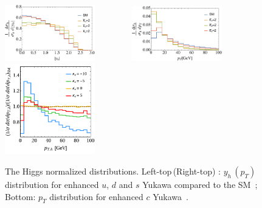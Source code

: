 \documentclass[../report.tex]{subfiles}
\begin{document}
\begin{figure}[t]
\begin{center}
\includegraphics[width=0.35\textwidth]{Disteta.pdf}~~~~~~~~
\includegraphics[width=0.35\textwidth]{DistpT.pdf}\\
\includegraphics[width=0.35\textwidth]{normalizedcharm8TeV.pdf}
\caption{The Higgs normalized distributions. 
Left-top\,(Right-top) : $y_h\,(p_T)$ distribution for enhanced $u$, $d$ and $s$ Yukawa compared to the SM~\cite{Soreq:2016rae};
Bottom: $p_T$ distribution for enhanced $c$ Yukawa~\cite{Bishara:2016jga}. 
}
\label{fig:HiggsDist}
\end{center}
\end{figure}
\end{document}
